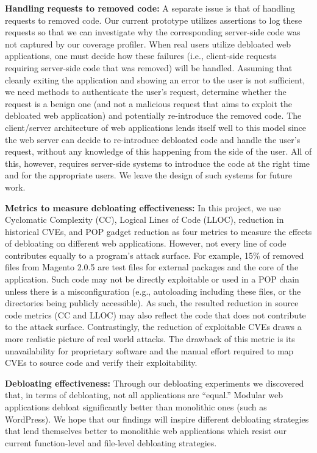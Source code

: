 \vspace{1ex}
\noindent\textbf{Handling requests to removed code:}
A separate issue is that of handling requests to removed code. Our
current prototype utilizes assertions to log these requests so that we can
investigate why the corresponding server-side code was not captured by our
coverage profiler. When real users utilize debloated web applications,
one must decide how these failures (i.e., client-side requests requiring
server-side code that was removed) will be handled. Assuming that cleanly
exiting the application and showing an error to the user is not sufficient,
we need methods to authenticate the user's request, determine whether the
request is a benign one (and not a malicious request that aims to exploit
the debloated web application) and potentially re-introduce the removed
code. The client/server architecture of web applications lends itself well
to this model since the web server can decide to re-introduce debloated code
and handle the user's request, without any knowledge of this happening from
the side of the user. All of this, however, requires server-side systems
to introduce the code at the right time and for the appropriate users. We
leave the design of such systems for future work.

\vspace{1ex}
\noindent\textbf{Metrics to measure debloating effectiveness:}
In this project, we use Cyclomatic Complexity (CC), Logical Lines of Code
(LLOC), reduction in historical CVEs, and POP gadget reduction as four metrics to measure the
effects of debloating on different web applications. However, not every line of code
contributes equally to a program's attack surface. For example, 15\% of removed
files from Magento 2.0.5 are test files for external packages and
the core of the application. Such code may not be directly exploitable or
used in a POP chain unless there is a misconfiguration (e.g., autoloading
including these files, or the directories being publicly accessible). As such,
the resulted reduction in source code metrics (CC and LLOC) may also reflect the code
that does not contribute to the attack surface.
Contrastingly, the reduction of exploitable CVEs draws a more realistic picture
of real world attacks. The drawback of this metric is its unavailability for
proprietary software and the manual effort required to map CVEs to source
code and verify their exploitability.

\vspace{1ex}
\noindent\textbf{Debloating effectiveness:}
Through our debloating experiments we discovered that, in terms of debloating,
not all applications are ``equal.'' Modular web applications debloat
significantly better than monolithic ones (such as WordPress). We hope that
our findings will inspire different debloating strategies that lend themselves
better to monolithic web applications which resist our current function-level
and file-level debloating strategies.




